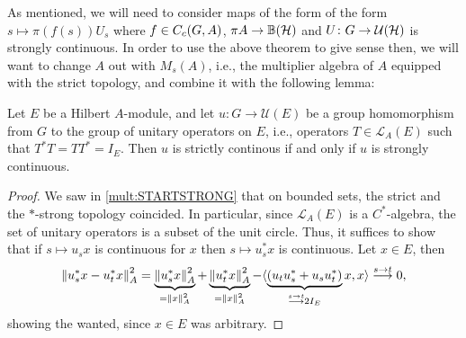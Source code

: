 As mentioned, we will need to consider maps of the form of the form $s \mapsto \pi(f(s)) U_s$ where $f \in C_c(G,A)$, $\pi A \to \mathbb{B}(\mathcal{H})$ and $U \colon G \to \mathcal{U}(\mathcal{H})$ is strongly continuous. In order to use the above theorem to give sense then, we will want to change $A$ out with $M_s(A)$, i.e., the multiplier algebra of $A$ equipped with the strict topology, and combine it with the following lemma:
\begin{lemma}
	Let $E$ be a Hilbert $A$-module, and let $u \colon G \to \mathcal{U}(E)$ be a group homomorphism from $G$ to the group of unitary operators on $E$, i.e., operators $T \in \mathcal{L}_A(E)$ such that $T^*T=TT^*=I_E$. Then $u$ is strictly continous if and only if $u$ is strongly continuous.
	\label{int:unistrictstrong}
\end{lemma}
\begin{proof}
	We saw in \cref{mult:STARTSTRONG} that on bounded sets, the strict and the $*$-strong topology coincided. In particular, since $\mathcal{L}_A(E)$ is a $C^*$-algebra, the set of unitary operators is a subset of the unit circle. Thus, it suffices to show that if $s \mapsto u_s x$ is continuous for $x$ then $s \mapsto u_s^* x$ is continuous. Let $x \in E$, then
	\begin{align*}
		\left\lVert u_s^* x - u_t^*x \right\rVert_A^2 = \underbrace{\left\lVert u_s^* x \right\rVert_A^2}_{= \left\lVert x \right\rVert_A^2} + \underbrace{\left\lVert u_t^*x \right\rVert_A^2}_{= \left\lVert x \right\rVert_A^2} - \langle \underbrace{ \left( u_t u_s^* + u_s u_t^*  \right)}_{\stackrel{s \to t}{\longrightarrow} 2I_E} x ,x \rangle \stackrel{s \to t}{\longrightarrow} 0,
	\end{align*}
	showing the wanted, since $x \in E$ was arbitrary.
\end{proof}

